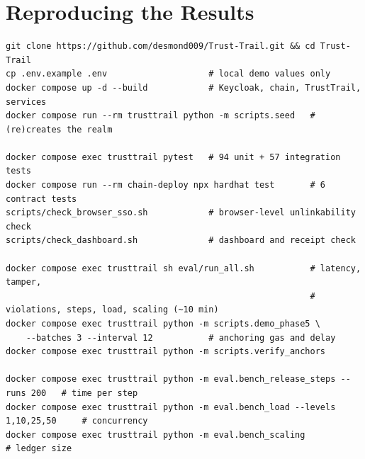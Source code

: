 \section{Reproducing the Results}
\label{app:repro}

\begin{lstlisting}[caption={Commands to run the system, the tests and the evaluation}, label={lst:repro}]
git clone https://github.com/desmond009/Trust-Trail.git && cd Trust-Trail
cp .env.example .env                    # local demo values only
docker compose up -d --build            # Keycloak, chain, TrustTrail, services
docker compose run --rm trusttrail python -m scripts.seed   # (re)creates the realm

docker compose exec trusttrail pytest   # 94 unit + 57 integration tests
docker compose run --rm chain-deploy npx hardhat test       # 6 contract tests
scripts/check_browser_sso.sh            # browser-level unlinkability check
scripts/check_dashboard.sh              # dashboard and receipt check

docker compose exec trusttrail sh eval/run_all.sh           # latency, tamper,
                                                            # violations, steps, load, scaling (~10 min)
docker compose exec trusttrail python -m scripts.demo_phase5 \
    --batches 3 --interval 12           # anchoring gas and delay
docker compose exec trusttrail python -m scripts.verify_anchors

docker compose exec trusttrail python -m eval.bench_release_steps --runs 200   # time per step
docker compose exec trusttrail python -m eval.bench_load --levels 1,10,25,50     # concurrency
docker compose exec trusttrail python -m eval.bench_scaling                       # ledger size
\end{lstlisting}
